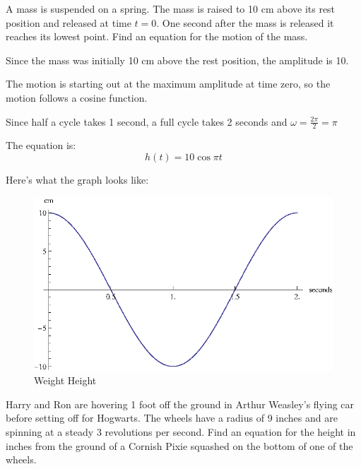 \documentclass[fleqn,addpoints]{exam}
\begin{document}
\begin{questions}
\begin{solution}
      \end{solution}

    \ifprintanswers
      \pagebreak
    \fi

    \question[8]
      A mass is suspended on a spring.  The mass is raised to 10 cm above its rest position and released at time $t =
      0$.  One second after the mass is released it reaches its lowest point.  Find an equation for the motion of the mass.
      
      \begin{solution}
        \begin{itemize*}
          \item Since the mass was initially 10 cm above the rest position, the amplitude is 10.
          \item The motion is starting out at the maximum amplitude at time zero, so the motion follows a cosine
            function.
          \item Since half a cycle takes 1 second, a full cycle takes 2 seconds and $\omega = \frac{2 \pi}{2} = \pi$ 
        \end{itemize*}

        The equation is:
        \[
          h(t) = 10 \cos \pi t
        \]

        Here's what the graph looks like:
        \begin{figure}[H]
          \centering
          \includegraphics[scale=1.0]{spring.eps}
          \caption{Weight Height}
        \end{figure}

      \end{solution}

    \ifprintanswers
      \pagebreak
    \fi

    \question[10] 
      Harry and Ron are hovering 1 foot off the ground in Arthur Weasley's flying car before setting off for Hogwarts.
      The wheels have a radius of 9 inches and are spinning at a steady 3 revolutions per second.  Find an equation for
      the height in inches from the ground of a Cornish Pixie squashed on the bottom of one of the wheels.


\end{questions}
\end{document}

